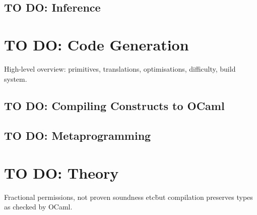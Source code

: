 \subsection{TO DO: Inference}

\section{TO DO: Code Generation}

High-level overview: primitives, translations, optimisations, difficulty, build system.

\subsection{TO DO: Compiling Constructs to OCaml}

\subsection{TO DO: Metaprogramming}

\section{TO DO: Theory}

Fractional permissions, not proven soundness etc\. but compilation preserves
types as checked by OCaml.
